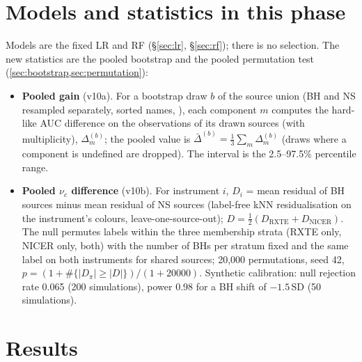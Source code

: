 \section{Models and statistics in this phase}
Models are the fixed LR and RF (\S\ref{sec:lr}, \S\ref{sec:rf}); there is no selection. The new statistics are the pooled bootstrap
and the pooled permutation test (\cref{sec:bootstrap,sec:permutation}):
\begin{itemize}
\item \textbf{Pooled gain} (v10a). For a bootstrap draw $b$ of the source union (BH and NS resampled separately, sorted names,
), each component $m$ computes the hard-like AUC difference on the observations of its drawn sources
(with multiplicity), $\Delta_m^{(b)}$; the pooled value is $\bar\Delta^{(b)}=\frac13\sum_m\Delta_m^{(b)}$ (draws where a component is
undefined are dropped). The interval is the 2.5--97.5\% percentile range.
\item \textbf{Pooled $\nu_c$ difference} (v10b). For instrument $i$, $D_i$ = mean residual of BH sources minus mean residual of NS
sources (label-free kNN residualisation on the instrument's colours, leave-one-source-out); $D=\frac12(D_\mathrm{RXTE}+D_\mathrm{NICER})$.
The null permutes labels within the three membership strata (RXTE only, NICER only, both) with the number of BHs per stratum
fixed and the same label on both instruments for shared sources; 20,000 permutations, seed 42, $p=(1+\#\{|D_\pi|\ge|D|\})/(1+20000)$.
Synthetic calibration: null rejection rate 0.065 (200 simulations), power 0.98 for a BH shift of $-1.5$\,SD (50 simulations).
\end{itemize}

\section{Results}\label{sec:p5results}

